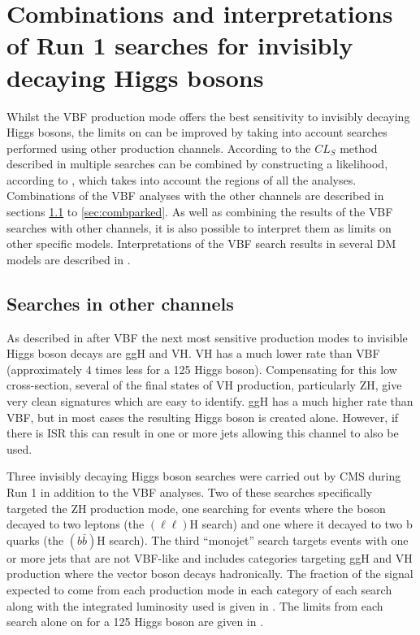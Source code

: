\chapter{Combinations and interpretations of Run 1 searches for invisibly decaying Higgs bosons}
\label{chap:comb}
Whilst the \ac{VBF} production mode offers the best sensitivity to invisibly decaying Higgs bosons, the limits on \BRinv can be improved by taking into account searches performed using other production channels. According to the $CL_{S}$ method described in  multiple searches can be combined by constructing a likelihood, according to , which takes into account the regions of all the analyses. Combinations of the \ac{VBF} analyses with the other channels are described in sections \ref{sec:combotherchannels} to \ref{sec:combparked}. As well as combining the results of the \ac{VBF} searches with other channels, it is also possible to interpret them as limits on other specific models. Interpretations of the \ac{VBF} search results in several \ac{DM} models are described in .


\section{Searches in other channels}
\label{sec:combotherchannels}
As described in  after \ac{VBF} the next most sensitive production modes to invisible Higgs boson decays are \ac{ggH} and \ac{VH}. \ac{VH} has a much lower rate than \ac{VBF} (approximately 4 times less for a 125 \GeV Higgs boson). Compensating for this low cross-section, several of the final states of \ac{VH} production, particularly \ac{ZH}, give very clean signatures which are easy to identify. \ac{ggH} has a much higher rate than \ac{VBF}, but in most cases the resulting Higgs boson is created alone. However, if there is \ac{ISR} this can result in one or more jets allowing this channel to also be used. 

Three invisibly decaying Higgs boson searches were carried out by CMS during Run 1 in addition to the \ac{VBF} analyses. Two of these searches specifically targeted the \ac{ZH} production mode, one searching for events where the \PZ boson decayed to two leptons (the \PZ$(\ell\ell)$H search) and one where it decayed to two b quarks (the \PZ$(b\bar{b})$H search). The third ``monojet'' search targets events with one or more jets that are not \ac{VBF}-like and includes categories targeting \ac{ggH} and \ac{VH} production where the vector boson decays hadronically. The fraction of the signal expected to come from each production mode in each category of each search along with the integrated luminosity used is given in . The limits from each search alone on \BRinv for a 125 \GeV Higgs boson are given in .

